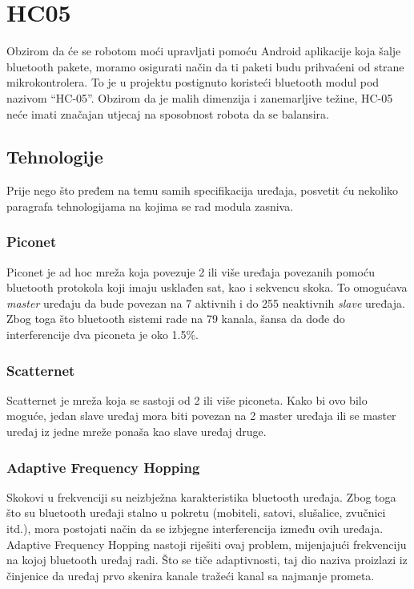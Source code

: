 \documentclass[../Document.tex]{subfiles}
\begin{document}
\section{HC05}\label{hc}
Obzirom da će se robotom moći upravljati pomoću Android aplikacije koja šalje bluetooth pakete, moramo osigurati način da ti paketi budu prihvaćeni od strane mikrokontrolera. To je u projektu postignuto koristeći bluetooth modul pod nazivom ``HC-05''. Obzirom da je malih dimenzija i zanemarljive težine, HC-05 neće imati značajan utjecaj na sposobnost robota da se balansira.

\subsection{Tehnologije}
Prije nego što pređem na temu samih specifikacija uređaja, posvetit ću nekoliko paragrafa tehnologijama na kojima se rad modula zasniva.

\subsubsection{Piconet}
Piconet je ad hoc mreža koja povezuje 2 ili više uređaja povezanih pomoću bluetooth protokola koji imaju usklađen sat, kao i sekvencu skoka. To omogućava \textit{master} uređaju da bude povezan na 7 aktivnih i do 255 neaktivnih \textit{slave} uređaja. Zbog toga što bluetooth sistemi rade na 79 kanala, šansa da dođe do interferencije dva piconeta je oko 1.5\%.
\vspace{1cm}

\subsubsection{Scatternet}
Scatternet je mreža koja se sastoji od 2 ili više piconeta. Kako bi ovo bilo moguće, jedan slave uređaj mora biti povezan na 2 master uređaja ili se master uređaj iz jedne mreže ponaša kao slave uređaj druge.

\subsubsection{Adaptive Frequency Hopping}
Skokovi u frekvenciji su neizbježna karakteristika bluetooth uređaja. Zbog toga što su bluetooth uređaji stalno u pokretu (mobiteli, satovi, slušalice, zvučnici itd.), mora postojati način da se izbjegne interferencija između ovih uređaja. Adaptive Frequency Hopping nastoji riješiti ovaj problem, mijenjajući frekvenciju na kojoj bluetooth uređaj radi. Što se tiče adaptivnosti, taj dio naziva proizlazi iz činjenice da uređaj prvo skenira kanale tražeći kanal sa najmanje prometa.
\end{document}
